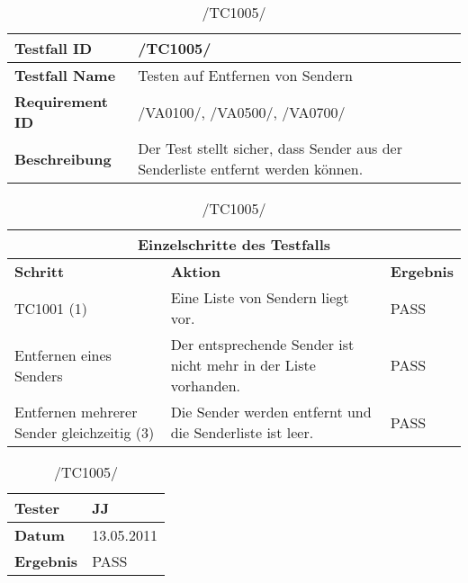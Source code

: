 \begin{table}[h]
\caption{/TC1005/}
\label{tab:TC1005}
\begin{center}
\begin{tabular}{|p{3.5cm}|p{11cm}|}
\hline
\textbf{Testfall ID} & /TC1005/\\
\hline
\textbf{Testfall Name} & Testen auf Entfernen von Sendern
\\
\hline
\textbf{Requirement ID} & /VA0100/, /VA0500/, /VA0700/\\
\hline
\textbf{Beschreibung} & Der Test stellt sicher, dass Sender aus der Senderliste
entfernt werden können.
\\
\hline
\end{tabular}
\begin{tabular}{|p{4cm}|p{7.8cm}|p{2.3cm}|}
\multicolumn{3}{|c|}{\textbf{Einzelschritte des Testfalls}} \\
\hline
\textbf{Schritt} & \textbf{Aktion} & \textbf{Ergebnis}\\
\hline
TC1001 (1) & Eine Liste
 von Sendern liegt vor. & PASS
\\
\hline
Entfernen eines Senders & Der entsprechende Sender ist nicht mehr in der Liste
 vorhanden. & PASS
\\
\hline
Entfernen mehrerer Sender gleichzeitig (3) & Die Sender
werden entfernt und die Senderliste ist leer. & PASS
\\
\hline
\end{tabular}
\begin{tabular}{|p{3.5cm}|p{11cm}|}
\textbf{Tester} & JJ\\
\hline
\textbf{Datum} & 13.05.2011\\
\hline
\textbf{Ergebnis} & PASS\\
\hline
\end{tabular}
\end{center}
\end{table}

